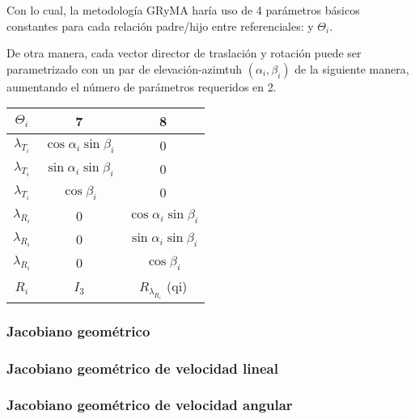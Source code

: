         Con lo cual, la metodología GRyMA haría uso de 4 parámetros básicos constantes 
        para cada relación padre/hijo entre referenciales: %
        y $\Theta_i$.

        De otra manera, cada vector director de traslación y rotación puede ser parametrizado 
        con un par de elevación-azimtuh $(\alpha_i,\beta_i)$ de la siguiente manera, 
        aumentando el número de parámetros requeridos en 2. 

        \begin{table}[H]
            \centering
            \begin{center}
                \begin{tabular}{ccc}
                    $\Theta_i$ & 7 & 8\\
                    \hline \hline 
                    $\lambda_{T_i}$ & $\cos{\alpha_i}\sin{\beta_i}$ & 0\\ 
                    $\lambda_{T_i}$ & $\sin{\alpha_i}\sin{\beta_i}$ & 0\\
                    $\lambda_{T_i}$ & $\cos{\beta_i}$ & 0\\
                    \hline 
                    $\lambda_{R_i}$ & 0 & $\cos{\alpha_i}\sin{\beta_i}$\\
                    $\lambda_{R_i}$ & 0 & $\sin{\alpha_i}\sin{\beta_i}$\\
                    $\lambda_{R_i}$ & 0 & $\cos{\beta_i}$\\
                    \hline 
                    $R_{i}$ & $I_3$ & $R_{\lambda_{R_i}}$ (qi)\\ 
                \end{tabular}
            \end{center}
        \end{table}

    \subsubsection{Jacobiano geométrico}
    \subsubsection{Jacobiano geométrico de velocidad lineal}
    \subsubsection{Jacobiano geométrico de velocidad angular}


